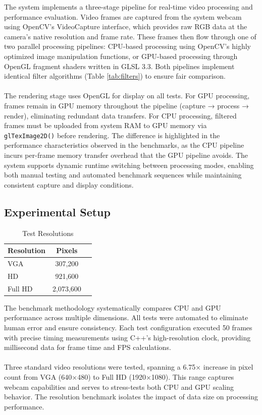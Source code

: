 \documentclass[12pt,a4paper]{article}
\begin{document}
The system implements a three-stage pipeline for real-time video processing and performance evaluation. Video frames are captured from the system webcam using OpenCV's VideoCapture interface, which provides raw RGB data at the camera's native resolution and frame rate. These frames then flow through one of two parallel processing pipelines: CPU-based processing using OpenCV's highly optimized image manipulation functions, or GPU-based processing through OpenGL fragment shaders written in GLSL 3.3. Both pipelines implement identical filter algorithms (Table \ref{tab:filters}) to ensure fair comparison.
\\\\
The rendering stage uses OpenGL for display on all tests. For GPU processing, frames remain in GPU memory throughout the pipeline (capture → process → render), eliminating redundant data transfers. For CPU processing, filtered frames must be uploaded from system RAM to GPU memory via \texttt{glTexImage2D()} before rendering. The difference is highlighted in the performance characteristics observed in the benchmarks, as the CPU pipeline incurs per-frame memory transfer overhead that the GPU pipeline avoids. The system supports dynamic runtime switching between processing modes, enabling both manual testing and automated benchmark sequences while maintaining consistent capture and display conditions.

\subsection{Experimental Setup}
\begin{table}
\centering
\caption{Test Resolutions}
\label{tab:resolutions}
\begin{tabular}{lcc}
\toprule
\textbf{Resolution} & \textbf{Pixels} \\
\midrule
VGA & 307,200 \\
HD & 921,600 \\
Full HD & 2,073,600 \\
\bottomrule
\end{tabular}
\end{table}
The benchmark methodology systematically compares CPU and GPU performance across multiple dimensions. All tests were automated to eliminate human error and ensure consistency. Each test configuration executed 50 frames with precise timing measurements using C++'s high-resolution clock, providing millisecond data for frame time and FPS calculations.
\\\\
Three standard video resolutions were tested, spanning a 6.75× increase in pixel count from VGA (640×480) to Full HD (1920×1080). This range captures webcam capabilities and serves to stress-tests both CPU and GPU scaling behavior. The resolution benchmark isolates the impact of data size on processing performance.
\end{document}

